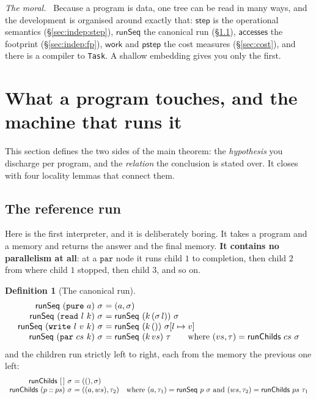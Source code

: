 \documentclass[11pt,a4paper]{article}
\theoremstyle{definition}
\newtheorem{definition}{Definition}
\theoremstyle{plain}
\theoremstyle{remark}
\newenvironment{moral}{\par\medskip\noindent\textit{The moral.}\ \ignorespaces}{\par\medskip}
\newcommand{\st}{\sigma}
\newcommand{\acc}{\mathsf{accesses}}
\newcommand{\runSeq}{\mathsf{runSeq}}
\newcommand{\work}{\mathsf{work}}
\newcommand{\pstep}{\mathsf{pstep}}
\newcommand{\upd}[3]{#1[#2 \mapsto #3]}
\begin{document}
\begin{moral}
Because a program is data, one tree can be read in many ways, and the development is
organised around exactly that: $\mathsf{step}$ is the operational semantics
(\S\ref{sec:indep:step}), $\runSeq$ the canonical run (\S\ref{sec:indep:runseq}), $\acc$ the
footprint (\S\ref{sec:indep:fp}), $\work$ and $\pstep$ the cost measures
(\S\ref{sec:cost}), and there is a compiler to \texttt{Task}. A shallow embedding gives you
only the first.
\end{moral}

\section{What a program touches, and the machine that runs it}\label{sec:indep}

This section defines the two sides of the main theorem: the \emph{hypothesis} you discharge
per program, and the \emph{relation} the conclusion is stated over. It closes with four
locality lemmas that connect them.

\subsection{The reference run}\label{sec:indep:runseq}

Here is the first interpreter, and it is deliberately boring. It takes a program and a
memory and returns the answer and the final memory. \textbf{It contains no parallelism at
all}: at a $\texttt{par}$ node it runs child $1$ to completion, then child $2$ from where
child $1$ stopped, then child $3$, and so on.

\begin{definition}[The canonical run]\label{def:runseq}
\[
\begin{array}{r@{\ }l}
  \runSeq\ (\texttt{pure}\ a)\ \st &= (a, \st) \\
  \runSeq\ (\texttt{read}\ l\ k)\ \st &= \runSeq\ (k\,(\st\,l))\ \st \\
  \runSeq\ (\texttt{write}\ l\ v\ k)\ \st &= \runSeq\ (k\,())\ \upd{\st}{l}{v} \\
  \runSeq\ (\texttt{par}\ cs\ k)\ \st &= \runSeq\ (k\,vs)\ \tau
    \qquad\text{where } (vs, \tau) = \mathsf{runChilds}\ cs\ \st
\end{array}
\]
and the children run strictly left to right, each from the memory the previous one left:
\[
\begin{array}{r@{\ }l}
  \mathsf{runChilds}\ [\,]\ \st &= ((), \st) \\
  \mathsf{runChilds}\ (p :: ps)\ \st &= ((a, ws), \tau_2)
    \quad\text{where } (a, \tau_1) = \runSeq\ p\ \st \text{ and } (ws, \tau_2) = \mathsf{runChilds}\ ps\ \tau_1
\end{array}
\]
\end{definition}
\end{document}

